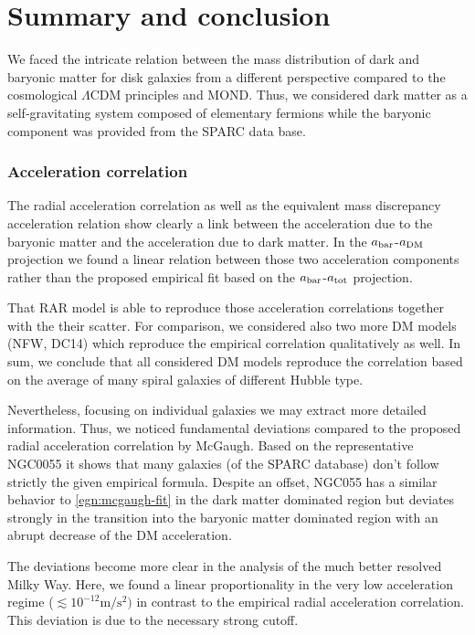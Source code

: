 \section{Summary and conclusion}
\label{sec:conclusion}
We faced the intricate relation between the mass distribution of dark and baryonic matter for disk galaxies from a different perspective compared to the cosmological $\Lambda$CDM principles and MOND. Thus, we considered dark matter as a self-gravitating system composed of elementary fermions while the baryonic component was provided from the SPARC data base.

\subsubsection*{Acceleration correlation}
The radial acceleration correlation \citep{2016arXiv160905917M} as well as the equivalent mass discrepancy acceleration relation \citep{2004ApJ...609..652M,2014Galax...2..601M} show clearly a link between the acceleration due to the baryonic matter and the acceleration due to dark matter. In the $a_\mathrm{bar}$-$a_\mathrm{DM}$ projection we found a linear relation between those two acceleration components rather than the proposed empirical fit based on the $a_\mathrm{bar}$-$a_\mathrm{tot}$ projection.

That RAR model is able to reproduce those acceleration correlations together with the their scatter. For comparison, we considered also two more DM models (NFW, DC14) which reproduce the empirical correlation qualitatively as well. In sum, we conclude that all considered DM models reproduce the correlation based on the average of many spiral galaxies of different Hubble type.

Nevertheless, focusing on individual galaxies we may extract more detailed information. Thus, we noticed fundamental deviations compared to the proposed radial acceleration correlation by McGaugh. Based on the representative NGC0055 it shows that many galaxies (of the SPARC database) don't follow strictly the given empirical formula. Despite an offset, NGC055 has a similar behavior to \cref{egn:mcgaugh-fit} in the dark matter dominated region but deviates strongly in the transition into the baryonic matter dominated region with an abrupt decrease of the DM acceleration.

The deviations become more clear in the analysis of the much better resolved Milky Way. Here, we found a linear proportionality in the very low acceleration regime ($\lesssim 10^{-12} \mathrm{m/s^2})$ in contrast to the empirical radial acceleration correlation. This deviation is due to the necessary strong cutoff.

